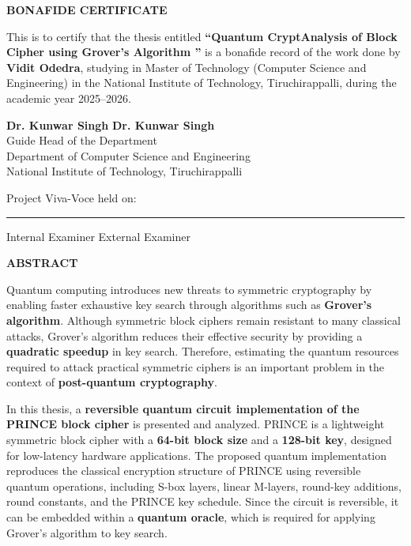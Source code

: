 \documentclass[12pt,a4paper]{report}
\begin{document}
\cleardoublepage
\setcounter{page}{2}
\doublespacing

\begin{center}
\textbf{BONAFIDE CERTIFICATE}
\end{center}

\vspace{2\baselineskip}

This is to certify that the thesis entitled \textbf{“Quantum CryptAnalysis of Block Cipher using Grover’s Algorithm
”} is a bonafide record of the work done by \textbf{Vidit Odedra}, studying in Master of Technology (Computer Science and Engineering) in the National Institute of Technology, Tiruchirappalli, during the academic year 2025–2026.

\vspace{30mm}

\noindent
\textbf{Dr. Kunwar Singh} \hfill \textbf{Dr. Kunwar Singh}\\
Guide \hfill Head of the Department\\
Department of Computer Science and Engineering\\
National Institute of Technology, Tiruchirappalli

\vspace{20mm}

\noindent
Project Viva-Voce held on: \rule{5cm}{0.4pt}

\vspace{10mm}

\noindent
Internal Examiner \hfill External Examiner

\cleardoublepage
\setcounter{page}{3}
\onehalfspacing

\begin{center}
\textbf{ABSTRACT}
\end{center}

Quantum computing introduces new threats to symmetric cryptography by enabling faster exhaustive key search through algorithms such as \textbf{Grover's algorithm}. Although symmetric block ciphers remain resistant to many classical attacks, Grover's algorithm reduces their effective security by providing a \textbf{quadratic speedup} in key search. Therefore, estimating the quantum resources required to attack practical symmetric ciphers is an important problem in the context of \textbf{post-quantum cryptography}.

In this thesis, a \textbf{reversible quantum circuit implementation of the PRINCE block cipher} is presented and analyzed. PRINCE is a lightweight symmetric block cipher with a \textbf{64-bit block size} and a \textbf{128-bit key}, designed for low-latency hardware applications. The proposed quantum implementation reproduces the classical encryption structure of PRINCE using reversible quantum operations, including S-box layers, linear M-layers, round-key additions, round constants, and the PRINCE key schedule. Since the circuit is reversible, it can be embedded within a \textbf{quantum oracle}, which is required for applying Grover's algorithm to key search.
\end{document}
